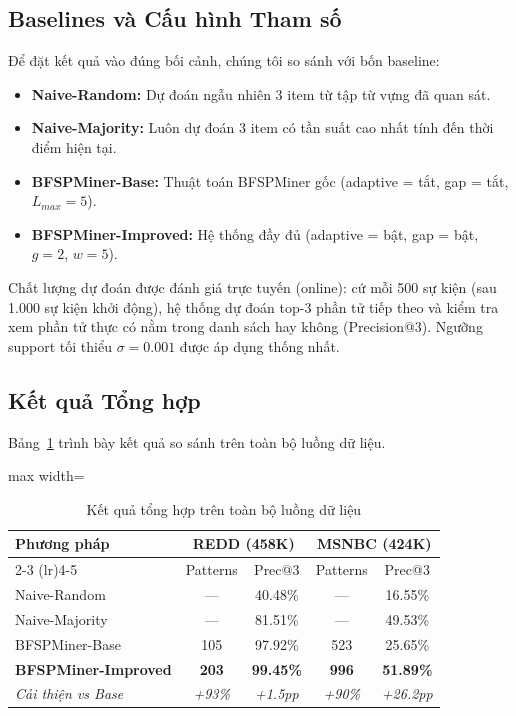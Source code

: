 \documentclass{article}
\begin{document}
\subsection{Baselines và Cấu hình Tham số}
Để đặt kết quả vào đúng bối cảnh, chúng tôi so sánh với bốn baseline:
\begin{itemize}
    \item \textbf{Naive-Random:} Dự đoán ngẫu nhiên 3 item từ tập từ vựng đã quan sát.
    \item \textbf{Naive-Majority:} Luôn dự đoán 3 item có tần suất cao nhất tính đến thời điểm hiện tại.
    \item \textbf{BFSPMiner-Base:} Thuật toán BFSPMiner gốc (adaptive = tắt, gap = tắt, $L_{max} = 5$).
    \item \textbf{BFSPMiner-Improved:} Hệ thống đầy đủ (adaptive = bật, gap = bật, $g = 2$, $w = 5$).
\end{itemize}
Chất lượng dự đoán được đánh giá trực tuyến (online): cứ mỗi 500 sự kiện (sau 1.000 sự kiện khởi động), hệ thống dự đoán top-3 phần tử tiếp theo và kiểm tra xem phần tử thực có nằm trong danh sách hay không (Precision@3). Ngưỡng support tối thiểu $\sigma = 0.001$ được áp dụng thống nhất.

\subsection{Kết quả Tổng hợp}
Bảng~\ref{tab:overall} trình bày kết quả so sánh trên toàn bộ luồng dữ liệu.

\begin{table}[htbp]
    \centering
    \caption{Kết quả tổng hợp trên toàn bộ luồng dữ liệu}
    \label{tab:overall}
    \begin{adjustbox}{max width=\columnwidth}
\begin{tabular}{lcccc}
        \toprule
        \multirow{2}{*}{\textbf{Phương pháp}} & \multicolumn{2}{c}{\textbf{REDD (458K)}} & \multicolumn{2}{c}{\textbf{MSNBC (424K)}} \\
        \cmidrule(lr){2-3} \cmidrule(lr){4-5}
         & Patterns & Prec@3 & Patterns & Prec@3 \\
        \midrule
        Naive-Random & --- & 40.48\% & --- & 16.55\% \\
        Naive-Majority & --- & 81.51\% & --- & 49.53\% \\
        BFSPMiner-Base & 105 & 97.92\% & 523 & 25.65\% \\
        \textbf{BFSPMiner-Improved} & \textbf{203} & \textbf{99.45\%} & \textbf{996} & \textbf{51.89\%} \\
        \midrule
        \textit{Cải thiện vs Base} & \textit{+93\%} & \textit{+1.5pp} & \textit{+90\%} & \textit{+26.2pp} \\
        \bottomrule
    \end{tabular}
\end{adjustbox}
\end{table}
\end{document}
